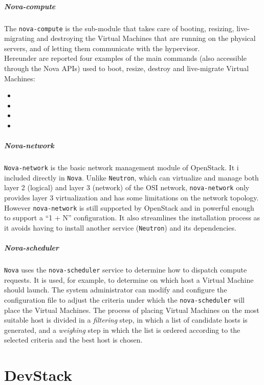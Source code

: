 \subparagraph{Nova-compute}
\label{par:openstack_nova_compute}
The \texttt{nova-compute} is the sub-module that takes care of booting, resizing, live-migrating and destroying the Virtual Machines that are running on the physical servers, and of letting them communicate with the hypervisor.\\
Hereunder are reported four examples of the main commands (also accessible through the Nova APIs) used to boot, resize, destroy and live-migrate Virtual Machines:
\begin{itemize}
	\item {}
	\item {}
	\item {}
	\item {}
\end{itemize}

\subparagraph{Nova-network}
\label{par:openstack_nova_net}
\texttt{Nova-network} is the basic network management module of OpenStack. It i included directly in \texttt{Nova}. Unlike \texttt{Neutron}, which can virtualize and manage both layer 2 (logical) and layer 3 (network) of the OSI network, \texttt{nova-network} only provides layer 3 virtualization and has some limitations on the network topology.\\
However \texttt{nova-network} is still supported by OpenStack and in powerful enough to support a ``1 + N'' configuration. It also streamlines the installation process as it avoids having to install another service (\texttt{Neutron}) and its dependencies.

\subparagraph{Nova-scheduler}
\label{par:openstack_nova_sched}
\texttt{Nova} uses the \texttt{nova-scheduler} service to determine how to dispatch compute requests. It is used, for example, to determine on which host a Virtual Machine should launch. The system administrator can modify and configure the  configuration file to adjust the criteria under which the \texttt{nova-scheduler} will place the Virtual Machines. The process of placing Virtual Machines on the most suitable host is divided in a \textit{filtering} step, in which a list of candidate hosts is generated, and a \textit{weighing} step in which the list is ordered according to the selected criteria and the best host is chosen.

\section{DevStack}
\label{sec:devstack}
 
